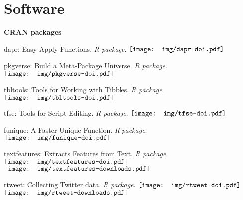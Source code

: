 \section{Software}

  \textbf{CRAN packages}
    \begin{innerlist}

      \item dapr: Easy Apply Functions. \textit{R package}.
      \href{https://doi.org/10.5281/zenodo.2528504}{$\vcenter{\hbox{\texttt{[image: img/dapr-doi.pdf]}}}$}

      \item  pkgverse: Build a Meta-Package Universe. \textit{R package}.
      \href{https://zenodo.org/badge/latestdoi/136514892}{$\vcenter{\hbox{\texttt{[image: img/pkgverse-doi.pdf]}}}$}

      \item tbltools: Tools for Working with Tibbles. \textit{R package}.
      \href{https://zenodo.org/badge/latestdoi/152122857}{$\vcenter{\hbox{\texttt{[image: img/tbltools-doi.pdf]}}}$}

      \item tfse: Tools for Script Editing. \textit{R package}.
      \href{https://zenodo.org/badge/latestdoi/62493045}{$\vcenter{\hbox{\texttt{[image: img/tfse-doi.pdf]}}}$}

      \item funique: A Faster Unique Function. \textit{R package}.
      \href{https://zenodo.org/badge/latestdoi/133566034}{$\vcenter{\hbox{\texttt{[image: img/funique-doi.pdf]}}}$}

      \item textfeatures: Extracts Features from Text. \textit{R package}.
      \href{https://zenodo.org/badge/latestdoi/123046986}{$\vcenter{\hbox{\texttt{[image: img/textfeatures-doi.pdf]}}}$}
      $\vcenter{\hbox{\texttt{[image: img/textfeatures-downloads.pdf]}}}$

      \item rtweet: Collecting Twitter data. \textit{R package}.
      \href{https://zenodo.org/badge/latestdoi/64161359}{$\vcenter{\hbox{\texttt{[image: img/rtweet-doi.pdf]}}}$}
      $\vcenter{\hbox{\texttt{[image: img/rtweet-downloads.pdf]}}}$

    \end{innerlist}\vspace{1em}

